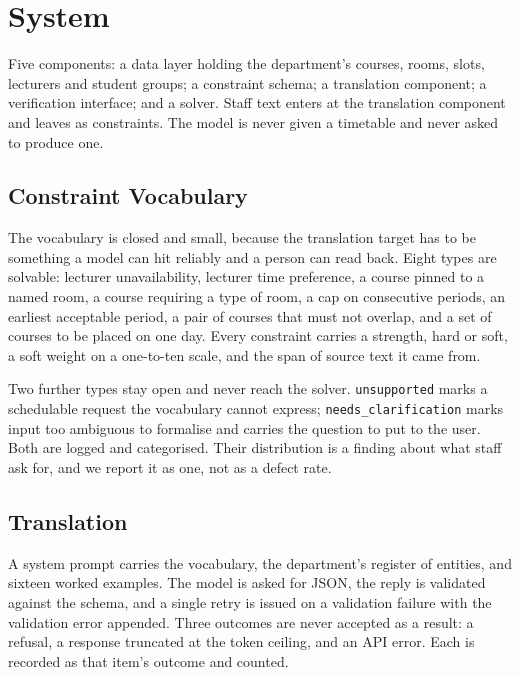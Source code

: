 \documentclass[acmsmall,screen,review,anonymous]{acmart}
\begin{document}
\section{System}

Five components: a data layer holding the department's courses, rooms, slots,
lecturers and student groups; a constraint schema; a translation component; a
verification interface; and a solver. Staff text enters at the translation
component and leaves as constraints. The model is never given a timetable and
never asked to produce one.

\subsection{Constraint Vocabulary}

The vocabulary is closed and small, because the translation target has to be
something a model can hit reliably and a person can read back. Eight types are
solvable: lecturer unavailability, lecturer time preference, a course pinned
to a named room, a course requiring a type of room, a cap on consecutive
periods, an earliest acceptable period, a pair of courses that must not
overlap, and a set of courses to be placed on one day. Every constraint
carries a strength, hard or soft, a soft weight on a one-to-ten scale, and the
span of source text it came from.

Two further types stay open and never reach the solver.
\texttt{unsupported} marks a schedulable request the vocabulary cannot
express; \texttt{needs\_clarification} marks input too ambiguous to formalise
and carries the question to put to the user. Both are logged and categorised.
Their distribution is a finding about what staff ask for, and we report it as
one, not as a defect rate.

\subsection{Translation}

A system prompt carries the vocabulary, the department's register of entities,
and sixteen worked examples. The model is asked for JSON, the reply is
validated against the schema, and a single retry is issued on a validation
failure with the validation error appended. Three outcomes are never accepted
as a result: a refusal, a response truncated at the token ceiling, and an API
error. Each is recorded as that item's outcome and counted.
\end{document}
